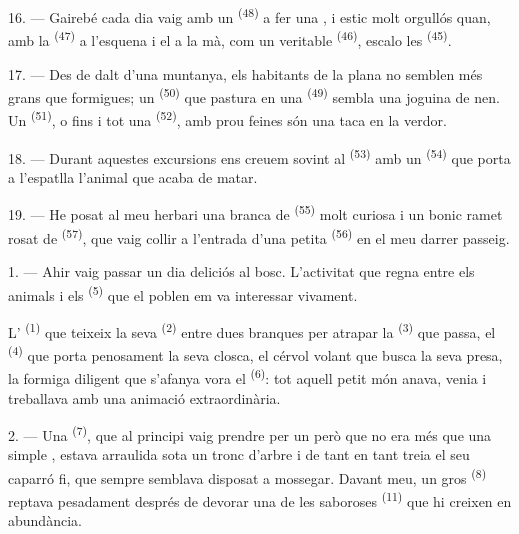 16. --- Gairebé cada dia vaig amb un  \textsuperscript{(48)} a fer una
, i estic molt orgullós quan, amb la 
\textsuperscript{(47)} a l'esquena i el  a la mà, com un
veritable  \textsuperscript{(46)}, escalo les 
\textsuperscript{(45)}.

17. --- Des de dalt d'una muntanya, els habitants de la plana no semblen més
grans que formigues; un  \textsuperscript{(50)} que
pastura en una  \textsuperscript{(49)} sembla una joguina de nen.
Un  \textsuperscript{(51)}, o fins i tot una 
\textsuperscript{(52)}, amb prou feines són una taca en la verdor.

18. --- Durant aquestes excursions ens creuem sovint al 
\textsuperscript{(53)} amb un  \textsuperscript{(54)} que
porta a l'espatlla l'animal que acaba de matar.

19. --- He posat al meu herbari una branca de 
\textsuperscript{(55)} molt curiosa i un bonic ramet rosat de 
\textsuperscript{(57)}, que vaig collir a l'entrada d'una petita 
\textsuperscript{(56)} en el meu darrer passeig.

\VUsaut{3.0mm}
\VUsaut{3.0mm}

\VUsaut{3.0mm}

1. --- Ahir vaig passar un dia deliciós al bosc. L'activitat que regna entre els
animals i els  \textsuperscript{(5)} que el poblen em va
interessar vivament.

L' \textsuperscript{(1)} que teixeix la seva 
\textsuperscript{(2)} entre dues branques per atrapar la 
\textsuperscript{(3)} que passa, el  \textsuperscript{(4)} que
porta penosament la seva closca, el cérvol volant que busca la seva presa, la
formiga diligent que s'afanya vora el  \textsuperscript{(6)}:
tot aquell petit món anava, venia i treballava amb una animació extraordinària.

2. --- Una  \textsuperscript{(7)}, que al principi vaig prendre per un
 però que no era més que una simple , estava
arraulida sota un tronc d'arbre i de tant en tant treia el seu caparró fi, que
sempre semblava disposat a mossegar. Davant meu, un gros 
\textsuperscript{(8)} reptava pesadament després de devorar una de les saboroses
 \textsuperscript{(11)} que hi creixen en abundància.

